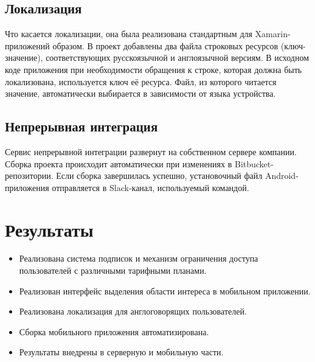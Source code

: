 \documentclass[14pt]{matmex-diploma-custom}
\begin{document}
\subsection*{Локализация}

Что касается локализации, она была реализована стандартным для Xamarin-приложений образом. В проект добавлены два файла строковых ресурсов (ключ-значение), соответствующих русскоязычной и англоязычной версиям. В исходном коде приложения при необходимости обращения к строке, которая должна быть локализована, используется ключ её ресурса. Файл, из которого читается значение, автоматически выбирается в зависимости от языка устройства.

\subsection*{Непрерывная интеграция}

Сервис непрерывной интеграции развернут на собственном сервере компании. Сборка проекта происходит автоматически при изменениях в Bitbucket-репозитории. Если сборка завершилась успешно, установочный файл Android-приложения отправляется в Slack-канал, используемый командой.

\newpage
\section*{Результаты}

\begin{itemize}  
\item Реализована система подписок и механизм ограничения доступа пользователей с различными тарифными планами.
\item Реализован интерфейс выделения области интереса в мобильном приложении.
\item Реализована локализация для англоговорящих пользователей.
\item Сборка мобильного приложения автоматизирована.
\item Результаты внедрены в серверную и мобильную части.
\end{itemize}

\setmonofont[Mapping=tex-text]{CMU Typewriter Text}


\end{document}
